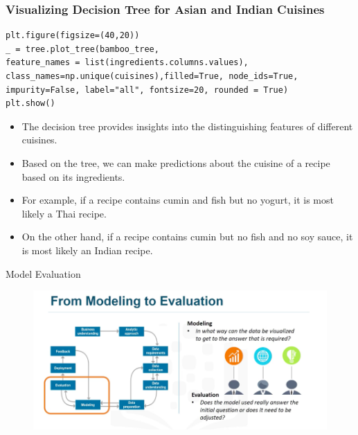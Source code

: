 \documentclass{beamer}
\begin{document}
\begin{frame}[fragile]
	\frametitle{Visualizing Decision Tree for Asian and Indian Cuisines}


	
\begin{lstlisting}
plt.figure(figsize=(40,20))
_ = tree.plot_tree(bamboo_tree,
feature_names = list(ingredients.columns.values),
class_names=np.unique(cuisines),filled=True, node_ids=True, impurity=False, label="all", fontsize=20, rounded = True)
plt.show()
\end{lstlisting}
	
	\begin{itemize}
		\item The decision tree provides insights into the distinguishing features of different cuisines.
		\item Based on the tree, we can make predictions about the cuisine of a recipe based on its ingredients.
		\item For example, if a recipe contains cumin and fish but no yogurt, it is most likely a Thai recipe.
		\item On the other hand, if a recipe contains cumin but no fish and no soy sauce, it is most likely an Indian recipe.
	\end{itemize}
\end{frame}


\begin{frame}{Model Evaluation}
	\begin{figure}
		\includegraphics[width=\textwidth]{Modelling.png}
	\end{figure}
\end{frame}
\end{document}
